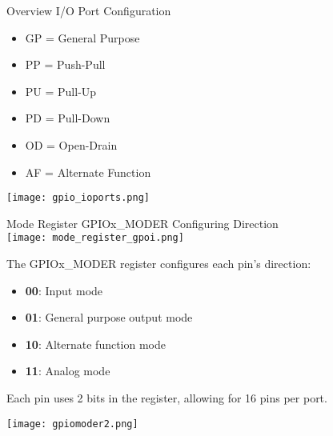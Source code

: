 \begin{definition}{Overview I/O Port Configuration}

    \begin{minipage}{0.5\linewidth}
        \begin{itemize}
            \item GP = General Purpose
            \item PP = Push-Pull
            \item PU = Pull-Up
        \end{itemize}
    \end{minipage}
    \begin{minipage}{0.5\linewidth}
        \begin{itemize}
            \item PD = Pull-Down
            \item OD = Open-Drain
            \item AF = Alternate Function
        \end{itemize}
    \end{minipage}
        
        \texttt{[image: gpio\_ioports.png]}
\end{definition}

\begin{concept}{Mode Register GPIOx\_MODER} Configuring Direction\\
    \texttt{[image: mode\_register\_gpoi.png]}

    \begin{minipage}{0.65\linewidth}
        The GPIOx\_MODER register configures each pin's direction:
        \begin{itemize}
            \item \textbf{00}: Input mode
            \item \textbf{01}: General purpose output mode
            \item \textbf{10}: Alternate function mode
            \item \textbf{11}: Analog mode
        \end{itemize}
        Each pin uses 2 bits in the register, allowing for 16 pins per port.
    \end{minipage}
    \begin{minipage}{0.35\linewidth}
        \texttt{[image: gpiomoder2.png]}
    \end{minipage}
\end{concept}

